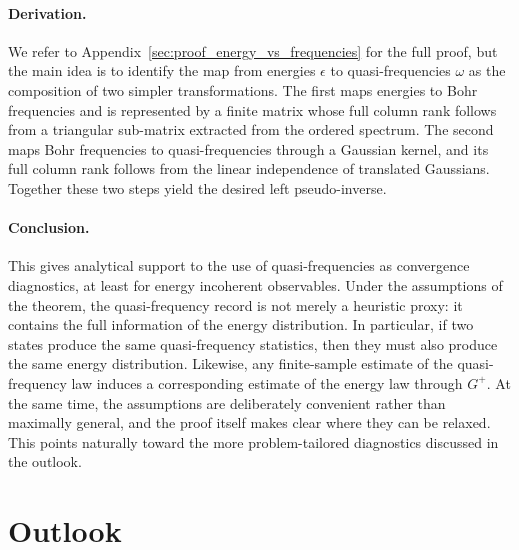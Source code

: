 \documentclass[showpacs,amsmath,amssymb,twocolumn,prx,superscriptaddress,10pt,aps,nofootinbib]{revtex4-2}
\begin{document}
\paragraph{Derivation.} We refer to Appendix~\ref{sec:proof_energy_vs_frequencies} for the full proof, but the main idea is to identify the map from energies $\epsilon$ to quasi-frequencies $\omega$ as the composition of two simpler transformations. The first maps energies to Bohr frequencies and is represented by a finite matrix whose full column rank follows from a triangular sub-matrix extracted from the ordered spectrum. The second maps Bohr frequencies to quasi-frequencies through a Gaussian kernel, and its full column rank follows from the linear independence of translated Gaussians. Together these two steps yield the desired left pseudo-inverse.

\paragraph{Conclusion.} This gives analytical support to the use of quasi-frequencies as convergence diagnostics, at least for energy incoherent observables. Under the assumptions of the theorem, the quasi-frequency record is not merely a heuristic proxy: it contains the full information of the energy distribution. In particular, if two states produce the same quasi-frequency statistics, then they must also produce the same energy distribution. Likewise, any finite-sample estimate of the quasi-frequency law induces a corresponding estimate of the energy law through \(G^+\). At the same time, the assumptions are deliberately convenient rather than maximally general, and the proof itself makes clear where they can be relaxed. This points naturally toward the more problem-tailored diagnostics discussed in the outlook.
\section{Outlook}
\label{sec:outlook}
\end{document}
